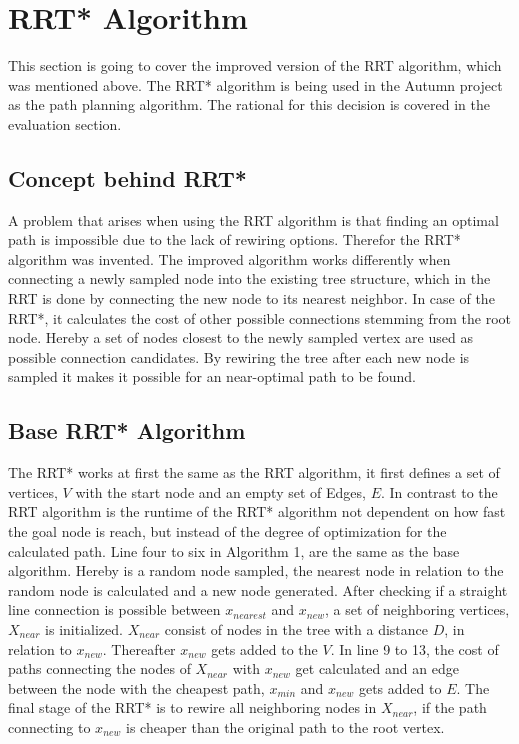 \section{RRT* Algorithm}

This section is going to cover the improved version of the RRT algorithm, which was mentioned above. The RRT* algorithm is being used in the Autumn project as the path planning algorithm. The rational for this decision is covered in the evaluation section. 

\subsection{Concept behind RRT*}

A problem that arises when using the RRT algorithm is that finding an optimal path is impossible due to the lack of rewiring options. Therefor the RRT* algorithm was invented. 
The improved algorithm works differently when connecting a newly sampled node into the existing tree structure, which in the RRT is done by connecting the new node to its nearest neighbor. In case of the RRT*, it calculates the cost of other possible connections stemming from the root node. Hereby a set of nodes closest to the newly sampled vertex are used as possible connection candidates. By rewiring the tree after each new node is sampled it makes it possible for an near-optimal path to be found.

\subsection{Base RRT* Algorithm}

The RRT* works at first the same as the RRT algorithm, it first defines a set of vertices, $V$ with the start node and an empty set of Edges, $E$. In contrast to the RRT algorithm is the runtime of the RRT* algorithm not dependent on how fast the goal node is reach, but instead of the degree of optimization for the calculated path.
Line four to six in Algorithm 1, are the same as the base algorithm. Hereby is a random node sampled, the nearest node in relation to the random node is calculated and a new node generated. After checking if a straight line connection is possible between $x_{nearest}$ and $x_{new}$, a set of neighboring vertices, $X_{near}$ is initialized.
$X_{near}$ consist of nodes in the tree with a distance $D$, in relation to $x_{new}$. Thereafter $x_{new}$ gets added to the $V$. In line 9 to 13, the cost of paths connecting the nodes of $X_{near}$ with $x_{new}$ get calculated and an edge between the node with the cheapest path, $x_{min}$ and $x_{new}$ gets added to $E$. The final stage of the RRT* is to rewire all neighboring nodes in $X_{near}$, if the path connecting to $x_{new}$ is cheaper than the original path to the root vertex. 

